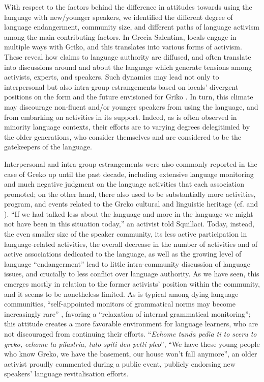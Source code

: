 \documentclass[output=paper,hidelinks]{langscibook}
\begin{document}
With respect to the factors behind the difference in attitudes towards using the language with new/younger speakers, we identified the different degree of language endangerment, community size, and different paths of language activism among the main contributing factors. In Grecìa Salentina, locals engage in multiple ways with Griko, and this translates into various forms of activism. These reveal how claims to language authority are diffused, and often translate into discussions around and about the language which generate tensions among activists, experts, and speakers. Such dynamics may lead not only to interpersonal but also intra-group estrangements based on locals’ divergent positions on the form and the future envisioned for Griko \citep[157]{Pellegrino2021}. In turn, this climate may discourage non-fluent and/or younger speakers from using the language, and from embarking on activities in its support. Indeed, as is often observed in minority language contexts, their efforts are to varying degrees delegitimied by the older generations, who consider themselves and are considered to be the gatekeepers of the language. 



Interpersonal and intra-group estrangements were also commonly reported in the case of Greko up until the past decade, including extensive language monitoring and much negative judgment on the language activities that each association promoted; on the other hand, there also used to be substantially more activities, program, and events related to the Greko cultural and linguistic heritage (cf. \citealt{Martino2009} and \citealt{Pipyrou2016}). “If we had talked less about the language and more in the language we might not have been in this situation today,” an activist told Squillaci. Today, instead, the even smaller size of the speaker community, its less active participation in language-related activities, the overall decrease in the number of activities and of active associations dedicated to the language, as well as the growing level of language ``endangerment'' lead to little intra-community discussion of language issues, and crucially to less conflict over language authority. As we have seen, this emerges mostly in relation to the former activists’ position within the community, and it seems to be nonetheless limited. As is typical among dying language communities, “self-appointed monitors of grammatical norms may become increasingly rare” \citep[154]{Dorian1981}, favoring a “relaxation of internal grammatical monitoring”; this attitude creates a more favorable environment for language learners, who are not discouraged from continuing their efforts. “\textit{Echome tunda pedìa ti to sceru to greko, echome ta pilastria, tuto spiti den petti pleo}”, ``We have these young people who know Greko, we have the basement, our house won’t fall anymore'', an older activist proudly commented during a public event, publicly endorsing new speakers’ language revitalisation efforts. 
\end{document}
